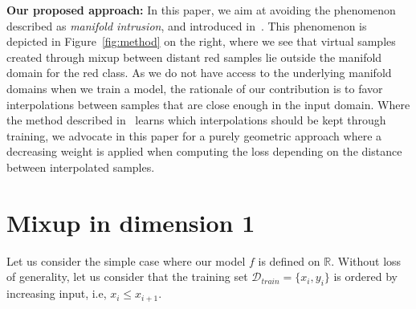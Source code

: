 \documentclass[twoside]{article}
\numberwithin{intassumption}{assumption}
\begin{document}
\textbf{Our proposed approach:}
In this paper, we aim at avoiding the phenomenon described as \emph{manifold intrusion}, and introduced in~\citep{guo2019mixup}. This phenomenon is depicted in Figure~\ref{fig:method} on the right, where we see that virtual samples created through mixup between distant red samples lie outside the manifold domain for the red class. As we do not have access to the underlying manifold domains when we train a model, the rationale of our contribution is to favor interpolations between samples that are close enough in the input domain. Where the method described in~\citep{guo2019mixup} learns which interpolations should be kept through training, we advocate in this paper for a purely geometric approach where a decreasing weight is applied when computing the loss depending on the distance between interpolated samples.







\section{Mixup in dimension 1}\label{theomixup}

Let us consider the simple case where our model $f$ is defined on $\mathbb{R}$. Without loss of generality, let us consider that the training set $\mathcal{D}_{train} = \{x_i, y_i\}$ is ordered by increasing input, i.e, $x_i \leq x_{i+1}$.
\end{document}
